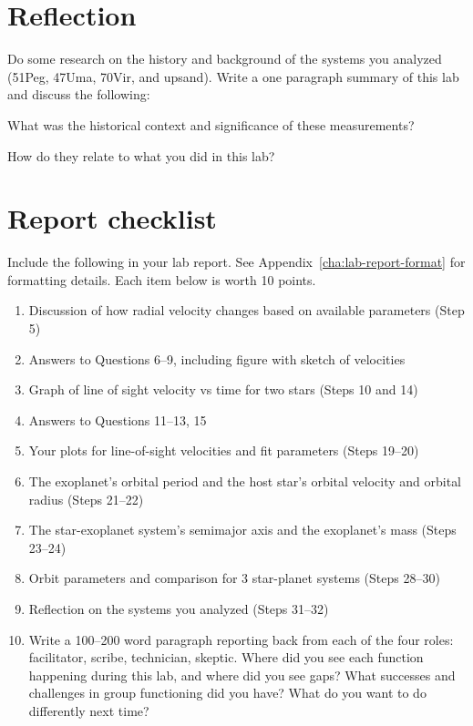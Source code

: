 \section{Reflection}

Do some research on the history and background of the systems you analyzed (51Peg, 47Uma, 70Vir, and upsand). Write a one paragraph summary of this lab and discuss the following:

\begin{steps}
	\item What was the historical context and significance of these measurements?
	
	\item How do they relate to what you did in this lab?
\end{steps}

\section{Report checklist}

Include the following in your lab report. See Appendix~\ref{cha:lab-report-format} for formatting details. Each item below is worth 10 points.

\begin{enumerate}
	\item Discussion of how radial velocity changes based on available parameters (Step 5)
	\item Answers to Questions 6--9, including figure with sketch of velocities
	\item Graph of line of sight velocity vs time for two stars (Steps 10 and 14)
	\item Answers to Questions 11--13, 15
	\item Your plots for line-of-sight velocities and fit parameters (Steps 19--20)
	\item The exoplanet's orbital period and the host star's orbital velocity and orbital radius (Steps 21--22)
	\item The star-exoplanet system's semimajor axis and the exoplanet's mass (Steps 23--24)
	\item Orbit parameters and comparison for 3 star-planet systems (Steps 28--30)
	\item Reflection on the systems you analyzed (Steps 31--32)
	\item Write a 100--200 word paragraph reporting back from each of the four roles: facilitator, scribe, technician, skeptic. Where did you see each function happening during this lab, and where did you see gaps? What successes and challenges in group functioning did you have? What do you want to do differently next time?
\end{enumerate}


